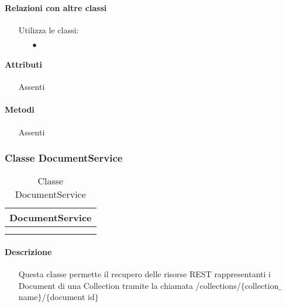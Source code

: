 \paragraph*{Relazioni con altre classi}
\begin{itemize}


\item[] Utilizza le classi:
\begin{itemize}
\item[$\bullet$] 
\end{itemize}
\end{itemize}

\paragraph*{Attributi}
\begin{itemize}
\item[] Assenti
\end{itemize}

\paragraph*{Metodi}
\begin{itemize}
\item[] Assenti
\end{itemize}

\subsubsection{Classe DocumentService}

\begin{table}[ht]
\begin{center}
\bgroup
\setlength{\arrayrulewidth}{0.6mm}
\def\arraystretch{1}
\begin{tabular}{ | p{12cm} | }
\hline
\centerline{\textbf{DocumentService}}
\\ \hline
 \\ 
\hline
 \\ 
\hline
\end{tabular}
\egroup
\caption{Classe DocumentService}
\end{center}
\end{table}

\paragraph*{Descrizione}
\begin{itemize}
\item[] Questa classe permette il recupero delle risorse REST rappresentanti i Document di una Collection tramite la chiamata /collections/$\{$collection$\_$name$\}$/$\{$document id$\}$
\end{itemize}

